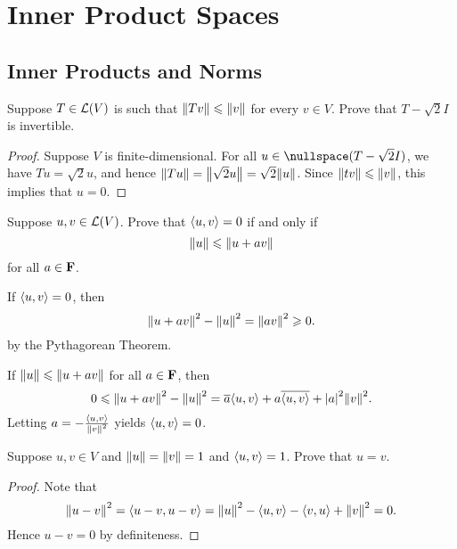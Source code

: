 \chapter{Inner Product Spaces}

\section{Inner Products and Norms}

\begin{exercise}{5}
	Suppose \( T \in \operatorname{\mathcal{L}}(V) \) is such that \( \norm{Tv} \le \norm{v} \) for every \( v \in V \). Prove that \( T-\sqrt{2}I \) is invertible.
\end{exercise}

\begin{proof}
	Suppose \( V \) is finite-dimensional. For all \( u \in \nullspace(T - \sqrt{2}I) \), we have \( Tu = \sqrt{2}u \), and hence \( \norm{Tu} = \norm{\sqrt{2}u} = \sqrt{2}\norm{u} \). Since \( \norm{tv} \le \norm{v} \), this implies that \( u = 0 \).
\end{proof}

\begin{exercise}{6}
	Suppose \( u, v \in \operatorname{\mathcal{L}}(V) \). Prove that \( \inp{u}{v} = 0 \) if and only if
	\[
		\norm{u} \le \norm{u + av}
	\]
	for all \( a \in \mathbf{F} \).
\end{exercise}

\begin{solution}
	If \( \inp{u}{v} = 0 \), then
	\[
		\norm{u + av}^{2} - \norm{u}^{2} = \norm{av}^{2} \ge 0.
	\]
	by the Pythagorean Theorem.

	If \( \norm{u} \le \norm{u + av} \) for all \( a \in \mathbf{F} \), then
	\[
		0 \le \norm{u + av}^{2} - \norm{u}^{2} = \conj{a}\inp{u}{v} + a\conj{\inp{u}{v}} + \abs{a}^{2}\norm{v}^{2}.
	\]
	Letting \( a = -\frac{\inp{u}{v}}{\norm{v}^{2}} \) yields \( \inp{u}{v} = 0 \).
\end{solution}

\begin{exercise}{8}
	Suppose \( u, v \in V \) and \( \norm{u} = \norm{v} = 1 \) and \( \inp{u}{v} = 1 \). Prove that \( u = v \).
\end{exercise}

\begin{proof}
	Note that
	\[
		\norm{u - v}^{2} = \inp{u - v}{u - v} = \norm{u}^{2} - \inp{u}{v} - \inp{v}{u} + \norm{v}^{2} = 0.
	\]
	Hence \( u - v = 0 \) by definiteness.
\end{proof}

